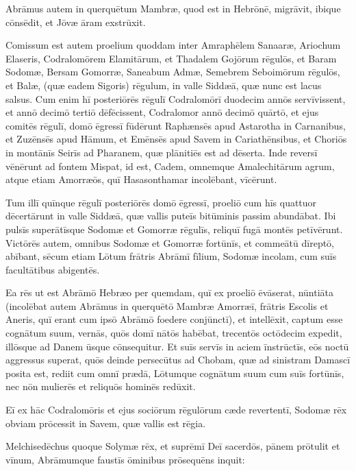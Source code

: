 \Versus Abrāmus autem in querquētum Mambræ, quod est in Hebrōnē, migrāvit, ibique cōnsēdit, et Jōvæ āram exstrūxit.



\Caput
\Versus Comissum est autem proelium quoddam inter Amraphēlem Sanaaræ, Ariochum Elaseris, Codralomōrem Elamitārum, et Thadalem Gojōrum rēgulōs,
\Versus et Baram Sodomæ, Bersam Gomorræ, Saneabum Admæ, Semebrem Seboimōrum rēgulōs, et Balæ, (quæ eadem Sigoris) rēgulum,
\Versus in valle Siddæā, quæ nunc est lacus salsus.
\Versus Cum enim hī posteriōrēs rēgulī Codralomōrī duodecim annōs servīvissent, et annō decimō tertiō dēfēcissent,
\Versus Codralomor annō decimō quārtō, et ejus comitēs rēgulī, domō ēgressī fūdērunt Raphænsēs apud Astarotha in Carnanibus, et Zuzēnsēs apud Hāmum, et Emēnsēs apud Savem in Cariathēnsibus,
\Versus et Choriōs in montānīs Seirīs ad Pharanem, quæ plānitiēs est ad dēserta.
\Versus Inde reversī vēnērunt ad fontem Mispat, id est, Cadem, omnemque Amalechitārum agrum, atque etiam Amorræōs, quī Hasasonthamar incolēbant, vīcērunt.

\Versus Tum illī quīnque rēgulī posteriōrēs domō ēgressī,
\Versus proeliō cum hīs quattuor dēcertārunt in valle Siddæā,
\Versus quæ vallis puteīs bitūminis passim abundābat.
\Versus Ibi pulsīs superātīsque Sodomæ et Gomorræ rēgulīs, reliquī fugā montēs petīvērunt.
\Versus Victōrēs autem, omnibus Sodomæ et Gomorræ fortūnīs, et commeātū dīreptō, abībant,
\Versus sēcum etiam Lōtum frātris Abrāmī fīlium, Sodomæ incolam, cum suīs facultātibus abigentēs.

\Versus Ea rēs ut est Abrāmō Hebræo per quemdam, quī ex proeliō ēvāserat, nūntiāta (incolēbat autem Abrāmus in querquētō Mambræ Amorræī, frātris Escolis et Aneris, quī erant cum ipsō Abrāmō foedere conjūnctī),
\Versus et intellēxit, captum esse cognātum suum, vernās, quōs domī nātōs habēbat, trecentōs octōdecim expedit, illōsque ad Danem ūsque cōnsequitur.
\Versus Et suīs servīs in aciem īnstrūctīs, eōs noctū aggressus superat, quōs deinde persecūtus ad Chobam, quæ ad sinistram Damascī posita est,
\Versus rediit cum omnī prædā, Lōtumque cognātum suum cum suīs fortūnīs, nec nōn mulierēs et reliquōs hominēs redūxit.

\Versus Eī ex hāc Codralomōris et ejus sociōrum rēgulōrum cæde revertentī, Sodomæ rēx obviam prōcessit in Savem, quæ vallis est rēgia.

\Versus Melchisedēchus quoque Solymæ rēx, et suprēmī Deī sacerdōs, pānem prōtulit et vīnum,
\Versus Abrāmumque faustīs ōminibus prōsequēns inquit:

